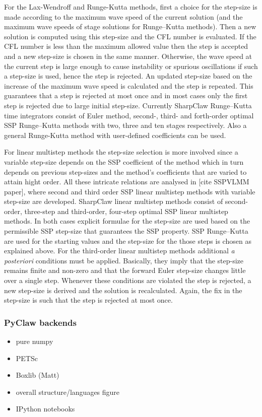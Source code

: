 For the Lax-Wendroff and Runge-Kutta methods, first a choice for the step-size is made according to the 
maximum wave speed of the current solution 
(and the maximum wave speeds of stage solutions for Runge--Kutta methods).
Then a new solution is computed using this step-size and the CFL number is evaluated.
If the CFL number is less than the maximum allowed value then the step is accepted and a new step-size is 
chosen in the same manner.
Otherwise, the wave speed at the current step is large enough to cause instability or spurious oscillations if 
such a step-size is used, hence the step is rejected.
An updated step-size based on the increase of the maximum wave speed is calculated and the step is
repeated.
This guarantees that a step is rejected at most once and in most cases only the first step is rejected due to 
large initial step-size.
Currently SharpClaw Runge--Kutta time integrators consist of Euler method, second-, third- and forth-order
optimal SSP Runge--Kutta methods with two, three and ten stages respectively.
Also a general Runge-Kutta method with user-defined coefficients can be used. 

For linear multistep methods the step-size selection is more involved since a variable step-size depends on
the SSP coefficient of the method which in turn depends on previous step-sizes and the method's coefficients 
that are varied to attain hight order. 
All these intricate relations are analysed in [cite SSPVLMM paper], where second and third order SSP linear
multistep methods with variable step-size are developed.
SharpClaw linear multistep methods consist of second-order, three-step and third-order, four-step optimal 
SSP linear multistep methods.
In both cases explicit formulae for the step-size are used based on the permissible SSP step-size that 
guarantees the SSP property.
SSP Runge--Kutta are used for the starting values and the step-size for the those steps is chosen as
explained above.
For the third-order linear multistep methods additional {\em a posteriori} conditions must be applied.
Basically, they imply that the step-size remains finite and non-zero and that the forward Euler step-size
changes little over a single step.
Whenever these conditions are violated the step is rejected, a new step-size is derived and the solution is
recalculated.
Again, the fix in the step-size is such that the step is rejected at most once.

\subsubsection{PyClaw backends}
\begin{itemize}
    \item pure numpy
    \item PETSc
    \item Boxlib (Matt)
\end{itemize}

\begin{itemize}
    \item overall structure/languages figure
    \item IPython notebooks
\end{itemize}
